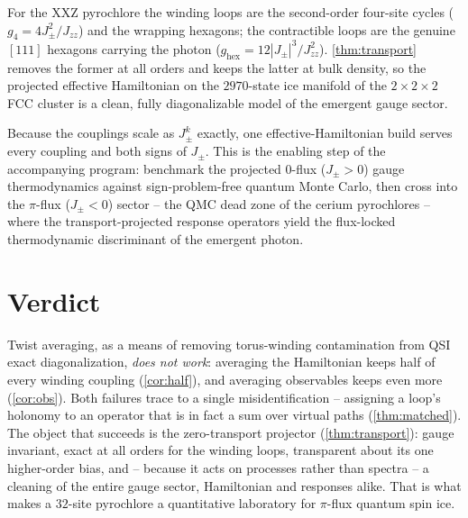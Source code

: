 \documentclass[11pt,letterpaper]{article}
\newcommand{\Jpm}{J_{\pm}}
\newcommand{\Jzz}{J_{zz}}
\newcommand{\gfour}{g_{4}}
\newcommand{\ghex}{g_{\mathrm{hex}}}
\theoremstyle{plain}
\theoremstyle{definition}
\begin{document}
For the XXZ pyrochlore the winding loops are the second-order four-site
cycles ($\gfour=4\Jpm^2/\Jzz$) and the wrapping hexagons; the
contractible loops are the genuine $[111]$ hexagons carrying the photon
($\ghex=12|\Jpm|^3/\Jzz^2$). \cref{thm:transport} removes the former at
all orders and keeps the latter at bulk density, so the projected
effective Hamiltonian on the $2970$-state ice manifold of the
$2{\times}2{\times}2$ FCC cluster is a clean, fully diagonalizable model
of the emergent gauge sector.

Because the couplings scale as $\Jpm^k$ exactly, one effective-Hamiltonian
build serves every coupling and both signs of $\Jpm$. This is the
enabling step of the accompanying program: benchmark the projected
$0$-flux ($\Jpm>0$) gauge thermodynamics against sign-problem-free
quantum Monte Carlo, then cross into the $\pi$-flux ($\Jpm<0$) sector --
the QMC dead zone of the cerium pyrochlores -- where the
transport-projected response operators yield the flux-locked
thermodynamic discriminant of the emergent photon.

\section{Verdict}
\label{sec:verdict}

Twist averaging, as a means of removing torus-winding contamination from
QSI exact diagonalization, \emph{does not work}: averaging the
Hamiltonian keeps half of every winding coupling
(\cref{cor:half}), and averaging observables keeps even more
(\cref{cor:obs}). Both failures trace to a single misidentification --
assigning a loop's holonomy to an operator that is in fact a sum over
virtual paths (\cref{thm:matched}). The object that succeeds is the
zero-transport projector (\cref{thm:transport}): gauge invariant, exact
at all orders for the winding loops, transparent about its one
higher-order bias, and -- because it acts on processes rather than
spectra -- a cleaning of the entire gauge sector, Hamiltonian and
responses alike. That is what makes a $32$-site pyrochlore a quantitative
laboratory for $\pi$-flux quantum spin ice.
\end{document}
